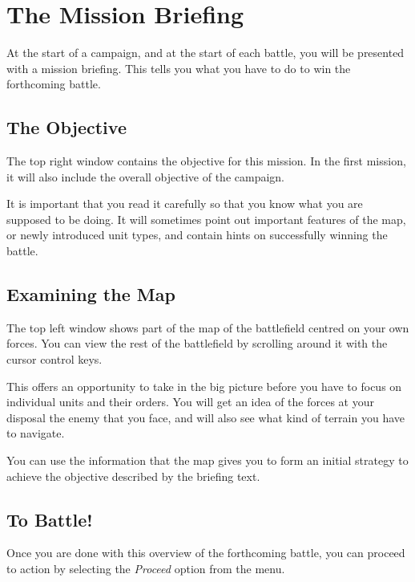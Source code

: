 %
%
%

\chapter{The Mission Briefing}

\noindent
At the start of a campaign, and at the start of each battle, you will be presented with a mission briefing. This tells you what you have to do to win the forthcoming battle.

\section{The Objective}

\noindent
The top right window contains the objective for this mission. In the first mission, it will also include the overall objective of the campaign.

It is important that you read it carefully so that you know what you are supposed to be doing. It will sometimes point out important features of the map, or newly introduced unit types, and contain hints on successfully winning the battle.

\section{Examining the Map}

\noindent
The top left window shows part of the map of the battlefield centred on your own forces. You can view the rest of the battlefield by scrolling around it with the cursor control keys.

This offers an opportunity to take in the big picture before you have to focus on individual units and their orders. You will get an idea of the forces at your disposal the enemy that you face, and will also see what kind of terrain you have to navigate.

You can use the information that the map gives you to form an initial strategy to achieve the objective described by the briefing text.

\section{To Battle!}

\noindent
Once you are done with this overview of the forthcoming battle, you can proceed to action by selecting the {\it Proceed} option from the menu.
